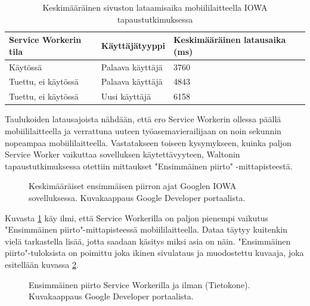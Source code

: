 \documentclass{tktltiki}
\begin{document}
\begin{table}[h]
\centering
\begin{small}
\caption{Keskimääräinen sivuston lataamisaika mobiililaitteella IOWA tapaustutkimuksessa \cite{Walton} }
\begin{tabular}{|L{5cm}|L{5cm}|L{5cm}|}
\hline
\textbf{Service Workerin tila} & 
\textbf{Käyttäjätyyppi} &
\textbf{Keskimääräinen latausaika (ms)}
\\ \hline
Käytössä & 
Palaava käyttäjä &
3760
\\ \hline
Tuettu, ei käytössä & 
Palaava käyttäjä &
4843
\\ \hline
Tuettu, ei käytössä & 
Uusi käyttäjä &
6158
\\ \hline
\end{tabular}
\label{table:loading time on mobile}
\end{small}
\end{table}

Taulukoiden latausajoista nähdään, että ero Service Workerin ollessa päällä mobiililaitteella ja verrattuna uuteen työasemavierailijaan on noin sekunnin nopeampaa mobiililaitteella. Vastatakseen toiseen kysymykseen, kuinka paljon Service Worker vaikuttaa sovelluksen käytettävyyteen, Waltonin \cite{Walton} tapaustutkimuksessa otettiin mittaukset "Ensimmäinen piirto" -mittapisteestä.

\begin{figure}[h]
\begin{center}
\caption{Keskimääräiset ensimmäisen piirron ajat Googlen IOWA sovelluksessa. Kuvakaappaus Google Developer portaalista.}
\label{Google AVG load times 1}
\end{center}
\end{figure}

Kuvasta \ref{Google AVG load times 1} käy ilmi, että Service Workerilla on paljon pienempi vaikutus "Ensimmäinen piirto"-mittapisteessä mobiililaitteella. Dataa täytyy kuitenkin vielä tarkastella lisää, jotta saadaan käsitys miksi asia on näin. "Ensimmäinen piirto"-tuloksista on poimittu joka ikinen sivulataus ja muodostettu kuvaaja, joka esitellään kuvassa \ref{Google AVG load times 2}.

\begin{figure}[h]
\begin{center}
\caption{Ensimmäinen piirto Service Workerilla ja ilman (Tietokone). Kuvakaappaus Google Developer portaalista.}
\label{Google AVG load times 2}
\end{center}
\end{figure}
\end{document}
